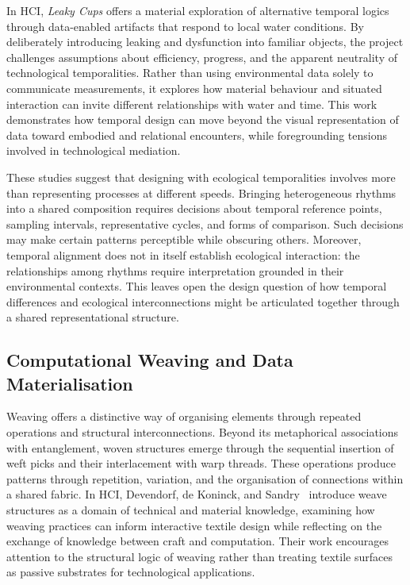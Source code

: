 \documentclass[manuscript,review,anonymous]{acmart}
\begin{document}
In HCI, \emph{Leaky Cups} \cite{key2025} offers a material exploration of alternative temporal logics through data-enabled artifacts that respond to local water conditions. By deliberately introducing leaking and dysfunction into familiar objects, the project challenges assumptions about efficiency, progress, and the apparent neutrality of technological temporalities. Rather than using environmental data solely to communicate measurements, it explores how material behaviour and situated interaction can invite different relationships with water and time. This work demonstrates how temporal design can move beyond the visual representation of data toward embodied and relational encounters, while foregrounding tensions involved in technological mediation.

These studies suggest that designing with ecological temporalities involves more than representing processes at different speeds. Bringing heterogeneous rhythms into a shared composition requires decisions about temporal reference points, sampling intervals, representative cycles, and forms of comparison. Such decisions may make certain patterns perceptible while obscuring others. Moreover, temporal alignment does not in itself establish ecological interaction: the relationships among rhythms require interpretation grounded in their environmental contexts. This leaves open the design question of how temporal differences and ecological interconnections might be articulated together through a shared representational structure.

\subsection{Computational Weaving and Data Materialisation}

Weaving offers a distinctive way of organising elements through repeated operations and structural interconnections. Beyond its metaphorical associations with entanglement, woven structures emerge through the sequential insertion of weft picks and their interlacement with warp threads. These operations produce patterns through repetition, variation, and the organisation of connections within a shared fabric. In HCI, Devendorf, de Koninck, and Sandry~\cite{devendorf2022} introduce weave structures as a domain of technical and material knowledge, examining how weaving practices can inform interactive textile design while reflecting on the exchange of knowledge between craft and computation. Their work encourages attention to the structural logic of weaving rather than treating textile surfaces as passive substrates for technological applications.
\end{document}

